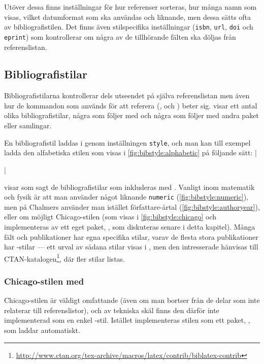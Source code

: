 \documentclass[10pt,../../a4.tex]{subfiles}
\begin{document}
Utöver dessa finns inställningar för hur referenser sorteras, hur många
namn som visas, vilket datumformat som ska användas och liknande, men
dessa sätts ofta av bibliografistilen.
Det finns även stilspecifika inställningar (\texttt{isbn}, \texttt{url},
\texttt{doi} och \texttt{eprint}) som kontrollerar om några av de
tillhörande fälten ska döljas från referenslistan.

\subsection{Bibliografistilar}
Bibliografistilarna kontrollerar dels utseendet på själva referenslistan
men även hur de kommandon som används för att referera (,
 och ) beter sig.
 visar ett antal olika
bibliografistilar, några som följer med  och några som
följer med andra paket eller samlingar.

En bibliografistil laddas i  genom inställningen
\texttt{style}, och man kan till exempel ladda den alfabetiska stilen
som visas i \cref{fig:bibstyle:alphabetic} på följande sätt:
\latex|\usepackage[style=alphabetic]{biblatex}|

 visar som sagt de bibliografistilar som inkluderas
med . Vanligt inom matematik och fysik är att man använder
något liknande \texttt{numeric} (\cref{fig:bibstyle:numeric}), men på
Chalmers använder man istället författare-årtal
(\cref{fig:bibstyle:authoryear}), eller om möjligt Chicago-stilen
(som visas i \cref{fig:bibstyle:chicago} och implementeras av ett eget
paket, , som diskuteras senare i detta kapitel).
Många fält och publikationer har egna specifika stilar, varav de flesta
stora publikationer har -stilar — ett urval av sådana
stilar visas i , men den intresserade hänvisas till
CTAN-katalogen\footnote{\url{http://www.ctan.org/tex-archive/macros/latex/contrib/biblatex-contrib}}, där fler stilar listas.

\subsubsection{Chicago-stilen med }
Chicago-stilen \parencite{Chicago10} är väldigt omfattande (även om man
bortser från de delar som inte relaterar till referenslistor), och av
tekniska skäl finns den därför inte implementerad som en enkel
-stil. Istället implementeras stilen som ett paket,
, som laddar  automatiskt.
\end{document}
